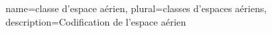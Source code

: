 {
    name=classe d'espace aérien,
    plural=classes d'espaces aériens,
    description={Codification de l'espace aérien}
}


